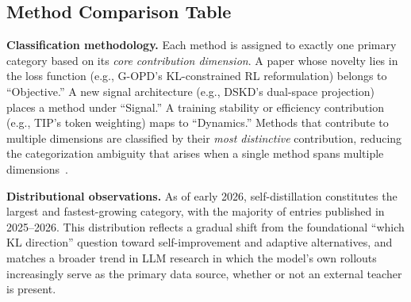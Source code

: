 \documentclass{article} %
\begin{document}
\subsection{Method Comparison Table}

\textbf{Classification methodology.} Each method is assigned to exactly one primary category based on its \emph{core contribution dimension}. A paper whose novelty lies in the loss function (e.g., G-OPD's KL-constrained RL reformulation) belongs to ``Objective.'' A new signal architecture (e.g., DSKD's dual-space projection) places a method under ``Signal.'' A training stability or efficiency contribution (e.g., TIP's token weighting) maps to ``Dynamics.'' Methods that contribute to multiple dimensions are classified by their \emph{most distinctive} contribution, reducing the categorization ambiguity that arises when a single method spans multiple dimensions~\citep{2402.13116}.

\textbf{Distributional observations.} As of early 2026, self-distillation constitutes the largest and fastest-growing category, with the majority of entries published in 2025--2026. This distribution reflects a gradual shift from the foundational ``which KL direction'' question toward self-improvement and adaptive alternatives, and matches a broader trend in LLM research in which the model's own rollouts increasingly serve as the primary data source, whether or not an external teacher is present.
\end{document}
